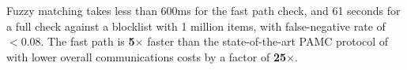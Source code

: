 

Fuzzy matching takes less than 600ms for the fast path check, and 61 seconds for a full check against a blocklist with 1 million items, with false-negative rate of $< 0.08$. The fast path is \textbf{5$\times$} faster than the state-of-the-art PAMC protocol of \citet{kulshrestha2021identifying} with lower overall communications costs by a factor of \textbf{25$\times$}.





